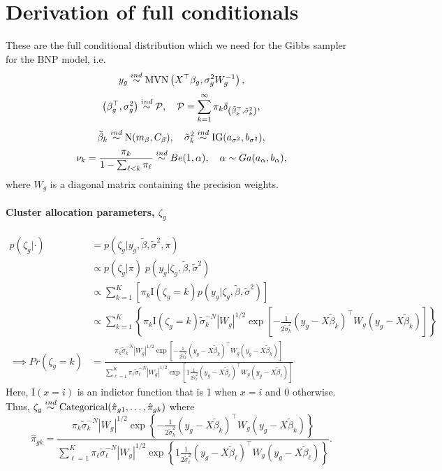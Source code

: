 \section{Derivation of full conditionals}
\label{deriv-full-cond}
\small
These are the full conditional distribution which we need for the Gibbs sampler for the BNP model, i.e.
\[y_{g} \stackrel{ind}{\sim} \operatorname{MVN} \left( X^\top \beta_g, \sigma^2_g W_g^{-1} \right),\]
\[\left(\beta_g^\top,\sigma^2_g\right) \stackrel{ind}{\sim} \mathcal{P}, \quad
\mathcal{P} =\sum_{k=1}^\infty \pi_k \delta_{\left(\tilde{\beta}_k^\top ,\tilde{\sigma}^2_k\right)},\]
\[\tilde{\beta}_k \stackrel{ind}{\sim} \operatorname{N}(m_\beta, C_\beta),\quad \tilde{\sigma}^2_k \stackrel{ind}{\sim} \operatorname{IG}(a_{\sigma^2}, b_{\sigma^2}), \]
\[\nu_k = \frac{\pi_k}{1 - \sum_{\ell<k}\pi_{\ell}} \stackrel{ind}{\sim} Be(1, \alpha), \quad \alpha \sim Ga(a_\alpha,b_\alpha),\]
where $W_g$ is a diagonal matrix containing the precision weights.


\paragraph{Cluster allocation parameters, $\zeta_g$}
\begin{align*}
p(\zeta_g|\cdot) & = p(\zeta_g|y_g, \tilde{\beta}, \tilde{\sigma}^2, \pi)\\
& \propto  p(\zeta_g|\pi)\; p(y_g|\zeta_g, \tilde{\beta}, \tilde{\sigma}^2)\\
& \propto  \sum_{k=1}^K \left[ \pi_k \mathrm{I}(\zeta_g=k) p(y_g|\zeta_g,\tilde{\beta},\tilde{\sigma}^2)\right]\\
& \propto \sum_{k=1}^K \left\{ \pi_k \mathrm{I}(\zeta_g=k)  \tilde{\sigma}_k^{-N} |W_g|^{1/2} \exp \left[ -\frac{1}{2\tilde{\sigma}^2_k} \left( y_g - X\tilde{\beta}_k \right)^\top W_g \left( y_g - X\tilde{\beta}_k \right) \right]\right\}\\
\implies Pr(\zeta_g=k) & = \frac{\pi_k \tilde{\sigma}_k^{-N} |W_g|^{1/2} \exp \left[ -\frac{1}{2\tilde{\sigma}^2_k} \left( y_g - X\tilde{\beta}_k \right)^\top W_g \left( y_g - X\tilde{\beta}_k \right) \right]}{\sum_{\ell=1}^K \pi_\ell \tilde{\sigma}_\ell^{-N} |W_g|^{1/2} \exp \left[ 1\frac{1}{2\tilde{\sigma}^2_\ell} \left( y_g - X\tilde{\beta}_\ell \right)^\top W_g \left( y_g - X\tilde{\beta}_\ell \right) \right]}
\end{align*}
Here, $\mathrm{I}(x=i)$ is an indictor function that is 1 when $x=i$ and 0 otherwise. 
Thus, $\zeta_g \stackrel{ind}{\sim} \operatorname{Categorical}(\hat{\pi}_{g1},\ldots,\hat{\pi}_{gk})$ where
\begin{equation*}
\hat{\pi}_{gk} = \frac{\pi_k \tilde{\sigma}_k^{-N} |W_g|^{1/2} \exp \left\{ -\frac{1}{2\tilde{\sigma}^2_k} \left( y_g - X\tilde{\beta}_k \right)^\top W_g \left( y_g - X\tilde{\beta}_k \right) \right\}}{\sum_{\ell=1}^K \pi_\ell \tilde{\sigma}_\ell^{-N} |W_g|^{1/2} \exp \left\{ 1\frac{1}{2\tilde{\sigma}^2_\ell} \left( y_g - X\tilde{\beta}_\ell \right)^\top W_g \left( y_g - X\tilde{\beta}_\ell \right) \right\}}.
\end{equation*}

